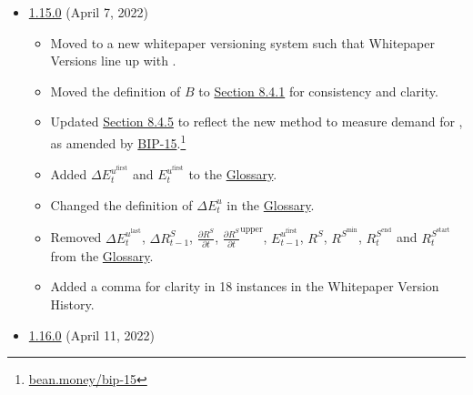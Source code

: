 \documentclass[class=article, crop=false]{standalone}
\begin{document}
\begin{itemize}[topsep=0pt, itemsep=3pt,leftmargin=16pt]
    \item \href{https://github.com/BeanstalkFarms/Beanstalk-Whitepaper/blob/master/version-history/beanstalk1_15_0.pdf}{1.15.0} (April 7, 2022)
    
    \begin{itemize}
        \item Moved to a new whitepaper versioning system such that Whitepaper Versions line up with . 
        \item Moved the definition of $B$ to \hyperlink{subsubsection.8.4.1}{Section 8.4.1} for consistency and clarity. 
        \item Updated \hyperlink{subsubsection.8.4.5}{Section 8.4.5} to reflect the new method to measure demand for , as amended by \href{https://bean.money/bip-15}{BIP-15}.\footnote{\href{https://bean.money/bip-15}{bean.money/bip-15}}
        \item Added  $\Delta E_{t}^{u^{\text{first}}}$ and $E_{t}^{u^{\text{first}}}$ to the \hyperlink{subsection.14.11}{Glossary}. 
        \item Changed the definition of $\Delta E_{t}^{u}$ in the \hyperlink{subsection.14.11}{Glossary}. 
        \item Removed $\Delta E_{t}^{u^{\text{last}}}$, $\Delta R_{t-1}^S$, $\frac{\partial R^S}{\partial t}$, $\frac{\partial R^S}{\partial t}^{\text{upper}}$, $E_{t-1}^{u^{\text{first}}}$, $R^S$, $R^{S^{\text{min}}}$, $R_t^{S^{\text{end}}}$ and $R_t^{S^{\text{start}}}$ from the \hyperlink{subsection.14.11}{Glossary}.
        \item Added a comma for clarity in 18 instances in the Whitepaper Version History.
    \end{itemize}  
    
    \item \href{https://github.com/BeanstalkFarms/Beanstalk-Whitepaper/blob/master/version-history/beanstalk1_16_0.pdf}{1.16.0} (April 11, 2022)
        

\end{itemize}
\end{document}
